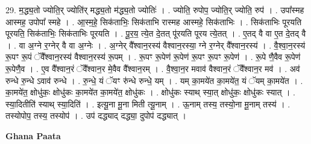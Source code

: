 \documentclass[17pt]{extarticle}
\begin{document}
29. म॒द्ध्य॒तो ज्योति॒र् ज्योति॑र् मद्ध्य॒तो म॑द्ध्य॒तो ज्योतिः॑ । . ज्योति॒ रुपोप॒ ज्योति॒र् ज्योति॒ रुप॑ । . उपा᳚स्मह आस्मह॒ उपोपा᳚ स्महे । . आ॒स्म॒हे॒ सिक॑ताभिः॒ सिक॑ताभि रास्मह आस्महे॒ सिक॑ताभिः । . सिक॑ताभिः पूरयति पूरयति॒ सिक॑ताभिः॒ सिक॑ताभिः पूरयति । . पू॒र॒य॒ त्ये॒त दे॒तत् पू॑रयति पूरय त्ये॒तत् । . ए॒तद् वै वा ए॒त दे॒तद् वै । . वा अ॒ग्ने र॒ग्नेर् वै वा अ॒ग्नेः । . अ॒ग्नेर् वै᳚श्वान॒रस्य॑ वैश्वान॒रस्या॒ ग्ने र॒ग्नेर् वै᳚श्वान॒रस्य॑ । . वै॒श्वा॒न॒रस्य॑ रू॒पꣳ रू॒पं ॅवै᳚श्वान॒रस्य॑ वैश्वान॒रस्य॑ रू॒पम् । . रू॒पꣳ रू॒पेण॑ रू॒पेण॑ रू॒पꣳ रू॒पꣳ रू॒पेण॑ । . रू॒पे णै॒वैव रू॒पेण॑ रू॒पेणै॒व । . ए॒व वै᳚श्वान॒रं ॅवै᳚श्वान॒र मे॒वैव वै᳚श्वान॒रम् । . वै॒श्वा॒न॒र मवाव॑ वैश्वान॒रं ॅवै᳚श्वान॒र मव॑ । . अव॑ रुन्धे रु॒न्धे ऽवाव॑ रुन्धे । . रु॒न्धे॒ यं ॅयꣳ रु॑न्धे रुन्धे॒ यम् । . यम् का॒मये॑त का॒मये॑त॒ यं ॅयम् का॒मये॑त । . का॒मये॑त॒ क्षोधु॑कः॒ क्षोधु॑कः का॒मये॑त का॒मये॑त॒ क्षोधु॑कः । . क्षोधु॑कः स्याथ् स्या॒त् क्षोधु॑कः॒ क्षोधु॑कः स्यात् । . स्या॒दितीति॑ स्याथ् स्या॒दिति॑ । . इत्यू॒ना मू॒ना मिती त्यू॒नाम् । . ऊ॒नाम् तस्य॒ तस्यो॒ना मू॒नाम् तस्य॑ । . तस्योपोप॒ तस्य॒ तस्योप॑ । . उप॑ दद्ध्याद् दद्ध्या॒ दुपोप॑ दद्ध्यात् । \newline

\textbf{Ghana Paata } \newline
\end{document}
